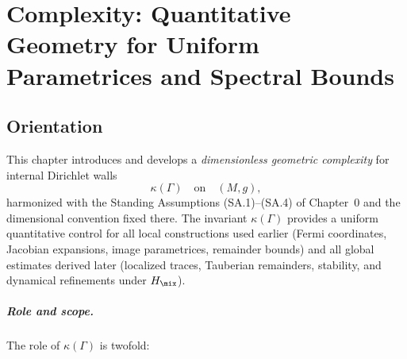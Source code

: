 
\providecommand{\vol}{\operatorname{vol}}
\providecommand{\Dom}{\operatorname{Dom}}
\providecommand{\Spec}{\operatorname{Spec}}
\providecommand{\Tr}{\operatorname{Tr}}
\providecommand{\dist}{\operatorname{dist}}
\providecommand{\reach}{\operatorname{reach}}
\providecommand{\inj}{\operatorname{inj}}
\providecommand{\Ric}{\operatorname{Ric}}
\providecommand{\II}{\mathrm{II}}
\providecommand{\Id}{\mathrm{Id}}


\chapter{Complexity: Quantitative Geometry for Uniform Parametrices and Spectral Bounds}
\label{chap:complexity}

\section*{Orientation}
This chapter introduces and develops a \emph{dimensionless geometric complexity} for internal Dirichlet walls
\[
\kappa(\Gamma)\quad\text{on}\quad (M,g),
\]
harmonized with the Standing Assumptions (SA.1)–(SA.4) of Chapter~0 and the dimensional convention fixed there.
The invariant $\kappa(\Gamma)$ provides a uniform quantitative control for all local constructions used earlier
(Fermi coordinates, Jacobian expansions, image parametrices, remainder bounds) and all global estimates derived later
(localized traces, Tauberian remainders, stability, and dynamical refinements under $H_{\mix}$).

\paragraph{Role and scope.}
The role of $\kappa(\Gamma)$ is twofold:

